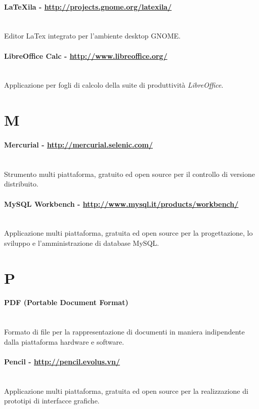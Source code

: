 \paragraph{LaTeXila - \url{http://projects.gnome.org/latexila/}} \hfill \\
Editor LaTex integrato per l'ambiente desktop GNOME.
\paragraph{LibreOffice Calc - \url{http://www.libreoffice.org/}} \hfill \\
Applicazione per fogli di calcolo della suite di produttività \textit{LibreOffice}.

\section*{M}
\paragraph{Mercurial - \url{http://mercurial.selenic.com/}} \hfill \\
Strumento multi piattaforma, gratuito ed open source per il controllo di versione distribuito.
\paragraph{MySQL Workbench - \url{http://www.mysql.it/products/workbench/}} \hfill \\
Applicazione multi piattaforma, gratuita ed open source per la progettazione, lo sviluppo e l'amministrazione di database MySQL. 

\section*{P}
\paragraph{PDF (Portable Document Format)} \hfill \\
Formato di file per la rappresentazione di documenti in maniera indipendente dalla piattaforma hardware e software.
\paragraph{Pencil - \url{http://pencil.evolus.vn/}} \hfill \\
Applicazione multi piattaforma, gratuita ed open source per la realizzazione di prototipi di interfacce grafiche.
